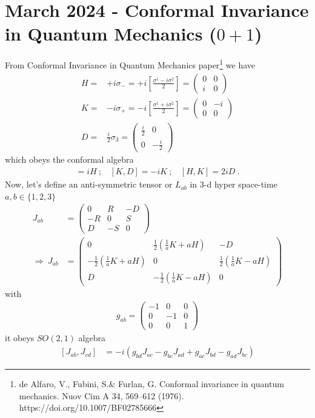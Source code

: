 \documentclass[]{article}
\numberwithin{equation}{section}
\begin{document}
{{\section{March 2024 - Conformal Invariance in Quantum Mechanics ($0+1$)}
From Conformal Invariance in Quantum Mechanics paper\footnote{de Alfaro, V., Fubini, S.$ \&$ Furlan, G. Conformal invariance in quantum mechanics. Nuov Cim A 34, 569–612 (1976). https://doi.org/10.1007/BF02785666} we have
\begin{align}
    H=&+i\sigma_{-}=+i\left[\frac{\sigma^{1}-i\sigma^{2}}{2}\right]=\begin{pmatrix}
        0&0\\
        i&0
    \end{pmatrix}\\
    K=&-i\sigma_{+}=-i\left[\frac{\sigma^{1}+i\sigma^{2}}{2}\right]=\begin{pmatrix}
        0&-i\\
        0&0
    \end{pmatrix}\\
    D=&\frac{i}{2}\sigma_{3}=\begin{pmatrix}
        \frac{i}{2}&0\\
        0&-\frac{i}{2}
    \end{pmatrix}
\end{align}
which obeys the conformal algebra
\begin{align}
    [H,D]=iH~;~~~~[K,D]=-iK~;~~~~[H,K]=2iD~.
\end{align}
Now, let's define an anti-symmetric tensor or $L_{ab}$ in 3-d hyper space-time $a,b\in \{1,2,3\}$
\begin{align}
    J_{ab}&=\begin{pmatrix}
        0&R&-D\\
        -R&0&S\\
        D&-S&0
    \end{pmatrix}\\
    \Longrightarrow~J_{ab}&=\begin{pmatrix}
        0&\frac{1}{2}\left(\frac{1}{a}K+aH\right)&-D\\
        -\frac{1}{2}\left(\frac{1}{a}K+aH\right)&0&\frac{1}{2}\left(\frac{1}{a}K-aH\right)\\
        D&-\frac{1}{2}\left(\frac{1}{a}K-aH\right)&0
    \end{pmatrix}
\end{align}
with
\begin{align}
    g_{ab}=\begin{pmatrix}
        -1&0&0\\
        0&-1&0\\
        0&0&1
    \end{pmatrix}
\end{align}
it obeys $SO(2,1)$ algebra
\begin{align}
    \left[J_{{a}{b}},J_{{c}{d}}\right]&=-i\left(g_{{b}{d}}J_{{a}{c}}-g_{{b}{c}}J_{{a}{d}}+g_{{a}{c}}J_{{b}{d}}-g_{{a}{d}}J_{{b}{c}}\right)
\end{align}
}}
\end{document}
